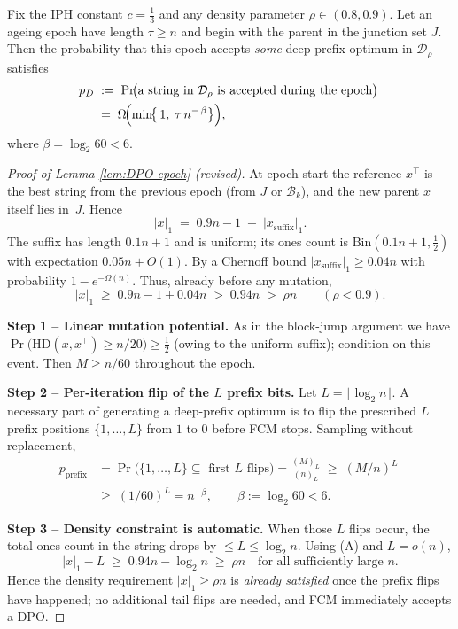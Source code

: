\begin{lemma}
	\label{lem:DPO-epoch}
	Fix the IPH constant \(c=\tfrac13\) and any density parameter \(\rho\in(0.8,0.9)\).  
	Let an ageing epoch have length \(\tau\ge n\) and begin with the parent in the
	junction set \(J\).  
	Then the probability that this epoch accepts \emph{some}
	deep-prefix optimum in \(\mathcal{D}_\rho\) satisfies
	\begin{align*}
		p_D
		\;&:=\;
		\Pr\!\bigl(\text{a string in }\mathcal{D}_\rho\text{ is accepted during the epoch}\bigr)
		\;\\&=\;
		\Omega\!\Bigl(\min\!\bigl\{\,1,\;
		\tau\,n^{-\,\beta}\bigr\}\Bigr),
	\end{align*}
	where \(\beta=\log_{2}60<6\). 
\end{lemma}
\begin{proof}[Proof of Lemma \ref{lem:DPO-epoch} (revised)]
	At epoch start the reference $x^\top$ is the best string from the previous
	epoch (from $J$ or $\mathcal{B}_k$), and the new parent $x$ itself lies in~$J$.
	Hence
	\[
	|x|_1\;=\;0.9n-1 \;+\; |x_{\text{suffix}}|_1.
	\]
	The suffix has length $0.1n+1$ and is uniform; its ones count is
	$\mathrm{Bin}(0.1n+1,\tfrac12)$ with expectation $0.05n+O(1)$.
	By a Chernoff bound
	\(
	|x_{\text{suffix}}|_1\ge 0.04n
	\)
	with probability $1-e^{-\Omega(n)}$.
	Thus, already before any mutation,
	\[
	|x|_1
	\;\ge\;
	0.9n-1 + 0.04n
	\;>\;
	0.94n
	\;>\;
	\rho n
	\qquad(\rho<0.9).
	\tag{A}
	\]
	
	\textbf{Step 1 – Linear mutation potential.}
	As in the block-jump argument we have
	\(
	\Pr\!\bigl(\mathrm{HD}(x,x^\top)\ge n/20\bigr)\ge\tfrac12
	\)
	(owing to the uniform suffix); condition on this event.
	Then \(M\ge n/60\) throughout the epoch.
	
	\textbf{Step 2 – Per-iteration flip of the \(L\) prefix bits.}
	Let \(L=\lfloor\log_2 n\rfloor\).
	A necessary part of generating a deep-prefix optimum is to flip the prescribed
	\(L\) prefix positions $\{1,\dots,L\}$ from $1$ to $0$ before FCM stops.
	Sampling without replacement,
	\begin{align*}
		p_{\text{prefix}}
		&=\Pr\bigl(\{1,\dots,L\}\subseteq\text{ first }L\text{ flips}\bigr)
		=\frac{(M)_{L}}{(n)_{L}}
		\;\ge\;
		(M/n)^{L}
		\;\\&\ge\;
		(1/60)^{L}
		=n^{-\beta},\qquad
		\beta:=\log_{2}60<6.
	\end{align*}
	
	\textbf{Step 3 – Density constraint is automatic.}
	When those $L$ flips occur, the total ones count in the string drops by
	\(\le L\le\log_2 n\).
	Using (A) and \(L=o(n)\),
	\[
	|x|_1-L\;\ge\;0.94n-\log_2 n
	\;\ge\;\rho n
	\quad\text{for all sufficiently large }n.
	\]
	Hence the density requirement \(|x|_1\ge\rho n\) is \emph{already satisfied}
	once the prefix flips have happened; no additional tail flips are needed, and
	FCM immediately accepts a DPO.
	

\end{proof}
